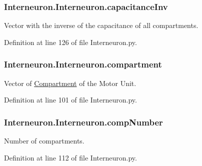 \subsubsection[{\texorpdfstring{capacitance\+Inv}{capacitanceInv}}]{\setlength{\rightskip}{0pt plus 5cm}Interneuron.\+Interneuron.\+capacitance\+Inv}\hypertarget{class_interneuron_1_1_interneuron_a6c5e0b83da3c1a4323699b81034692c9}{}\label{class_interneuron_1_1_interneuron_a6c5e0b83da3c1a4323699b81034692c9}


Vector with the inverse of the capacitance of all compartments. 



Definition at line 126 of file Interneuron.\+py.

\subsubsection[{\texorpdfstring{compartment}{compartment}}]{\setlength{\rightskip}{0pt plus 5cm}Interneuron.\+Interneuron.\+compartment}\hypertarget{class_interneuron_1_1_interneuron_a950d7c9a49f86305bc5d456fd924efa9}{}\label{class_interneuron_1_1_interneuron_a950d7c9a49f86305bc5d456fd924efa9}


Vector of \hyperlink{namespace_compartment}{Compartment} of the Motor Unit. 



Definition at line 101 of file Interneuron.\+py.

\subsubsection[{\texorpdfstring{comp\+Number}{compNumber}}]{\setlength{\rightskip}{0pt plus 5cm}Interneuron.\+Interneuron.\+comp\+Number}\hypertarget{class_interneuron_1_1_interneuron_a932bf948613265453822e7dd6fdac4a8}{}\label{class_interneuron_1_1_interneuron_a932bf948613265453822e7dd6fdac4a8}


Number of compartments. 



Definition at line 112 of file Interneuron.\+py.

